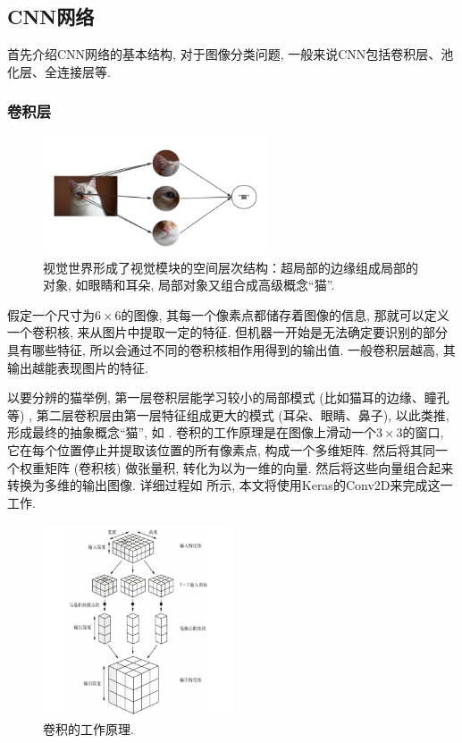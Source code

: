 \documentclass[lang=cn,11pt]{elegantpaper}
\begin{document}
\subsection{CNN网络}
首先介绍CNN网络的基本结构, 对于图像分类问题, 一般来说CNN包括卷积层、池化层、全连接层等. 
\subsubsection*{卷积层}
\tiny
\begin{figure}[htbp]
	\centering
  \includegraphics[width=0.6\textwidth]{cat1}
  \caption{视觉世界形成了视觉模块的空间层次结构：超局部的边缘组成局部的对象, 如眼睛和耳朵, 局部对象又组合成高级概念“猫”.\label{fig:cat1}}
\end{figure}

\normalsize
假定一个尺寸为$6\times 6$的图像, 其每一个像素点都储存着图像的信息, 那就可以定义一个卷积核, 来从图片中提取一定的特征. 但机器一开始是无法确定要识别的部分具有哪些特征, 所以会通过不同的卷积核相作用得到的输出值. 一般卷积层越高, 其输出越能表现图片的特征. 

以要分辨的猫举例, 第一层卷积层能学习较小的局部模式 (比如猫耳的边缘、瞳孔等) , 第二层卷积层由第一层特征组成更大的模式 (耳朵、眼睛、鼻子), 以此类推, 形成最终的抽象概念“猫”, 如 . 
卷积的工作原理是在图像上滑动一个$3\times 3$的窗口, 它在每个位置停止并提取该位置的所有像素点, 构成一个多维矩阵. 然后将其同一个权重矩阵 (卷积核) 做张量积, 转化为以为一维的向量. 然后将这些向量组合起来转换为多维的输出图像. 详细过程如  所示, 本文将使用Keras的Conv2D来完成这一工作. 
\begin{figure}[htbp]
	\centering
  \includegraphics[width=0.5\textwidth]{conv1.png}
  \caption{卷积的工作原理.\label{fig:conv1}}
\end{figure}
\end{document}
